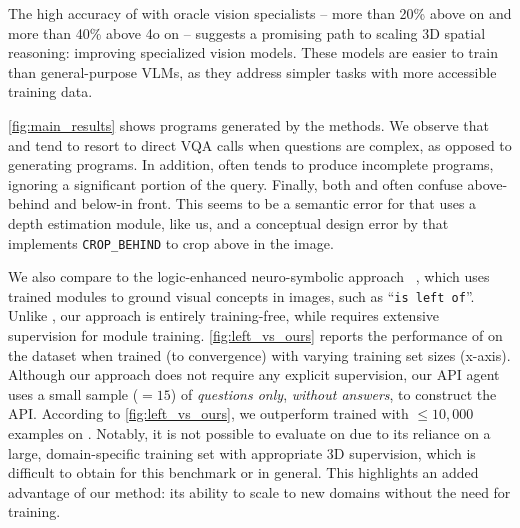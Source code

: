 The high accuracy of \method with oracle vision specialists -- more than 20\% above \claude on \clevr and more than 40\% above \gpt4o on \ourbench -- suggests a promising path to scaling 3D spatial reasoning: improving specialized vision models. These models are easier to train than general-purpose VLMs, as they address simpler tasks with more accessible training data.

\cref{fig:main_results} shows programs generated by the methods. We observe that \viper and \visprog tend to resort to direct VQA calls when questions are complex, as opposed to generating programs. 
In addition, \viper often tends to produce incomplete programs, ignoring a significant portion of the query. 
Finally, both \viper and \visprog often confuse above-behind and below-in front. 
This seems to be a semantic error for \viper that uses a depth estimation module, like us, and a conceptual design error by \visprog that implements \texttt{CROP\_BEHIND} to crop above in the image.

We also compare to the logic-enhanced neuro-symbolic approach \leftm~\cite{whatsleft}, which uses trained modules to ground visual concepts in images, such as ``\texttt{is left of}''. Unlike \leftm, our approach is entirely training-free, while \leftm requires extensive supervision for module training. \cref{fig:left_vs_ours} reports the performance of \leftm on the \clevr dataset when trained (to convergence) with varying training set sizes (x-axis). Although our approach does not require any explicit supervision, our API agent uses a small sample ($=15$) of \emph{questions only}, \emph{without answers}, to construct the API. 
According to \cref{fig:left_vs_ours}, we outperform \leftm trained with $\leq 10,000$ examples on \clevr.
Notably, it is not possible to evaluate \leftm on \ourbench due to its reliance on a large, domain-specific training set with appropriate 3D supervision, which is difficult to obtain for this benchmark or in general. 
This highlights an added advantage of our method: its ability to scale to new domains without the need for training. 


